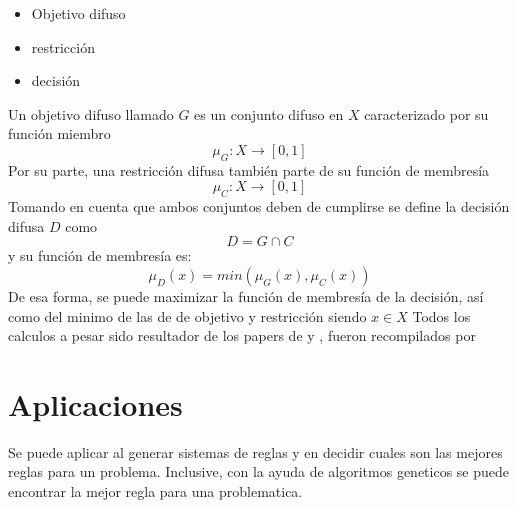 \documentclass{article}
\begin{document}
\begin{itemize}
    \item Objetivo difuso
    \item restricción
    \item decisión
\end{itemize}
Un objetivo difuso llamado $G$ es un conjunto difuso en $X $ caracterizado por su función miembro
$$\mu_G : X \rightarrow [0,1]$$
Por su parte, una restricción difusa también parte de su función de membresía
$$\mu_C : X \rightarrow [0,1]$$
Tomando en cuenta que ambos conjuntos deben de cumplirse se define la decisión difusa $D $ como
$$D= G \cap C$$
y su función de membresía es:
$$\mu_D(x)=min(\mu_G(x),\mu_C(x))$$ 
De esa forma, se puede maximizar la función de membresía de la decisión, así como del minimo de las de de objetivo y restricción siendo $x \in X $
Todos los calculos a pesar sido resultador de los papers de  \citep{3295591b-c3f1-3d45-b93b-b5949fd53fec} y \citep{ZADEH1965338}, fueron recompilados por \citep{sakawa1993fuzzy}
\section{Aplicaciones}
Se puede aplicar al generar sistemas de reglas y en decidir cuales son las mejores reglas para un problema. Inclusive, con la ayuda de algoritmos geneticos se puede encontrar la mejor regla para una problematica. 


\end{document}
